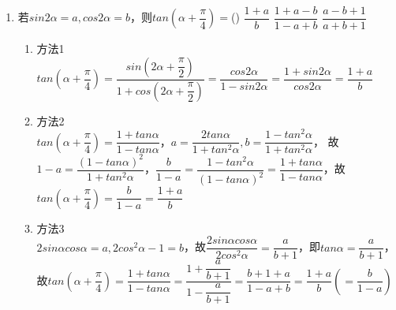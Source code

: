 \begin{enumerate}
\begin{enumerate}
        \item 若$sin2\alpha = a, cos2\alpha = b$，则$tan(\alpha + \dfrac{\pi}{4}) = $\dotfill()
        {$\dfrac{1+a}{b}$}
        {$\dfrac{1+a-b}{1-a+b}$}
        {$\dfrac{a-b+1}{a+b+1}$}
        \begin{jieda}
            \begin{enumerate}
                \item 方法1 \\
                $tan(\alpha + \dfrac{\pi}{4}) = \dfrac{sin(2\alpha+\dfrac{\pi}{2})}{1 + cos(2\alpha+\dfrac{\pi}{2})} = \dfrac{cos2\alpha}{1 - sin2\alpha} = \dfrac{1+sin2\alpha}{cos2\alpha} = \dfrac{1+a}{b}$
                \item 方法2 \\
                $tan(\alpha + \dfrac{\pi}{4}) = \dfrac{1+tan\alpha}{1-tan\alpha}$，$a = \dfrac{2tan\alpha}{1+tan^2\alpha}, b = \dfrac{1-tan^2\alpha}{1+tan^2\alpha}$，
                故$1-a = \dfrac{(1-tan\alpha)^2}{1+tan^2\alpha}$，$\dfrac{b}{1-a} = \dfrac{1-tan^2\alpha}{(1-tan\alpha)^2} = \dfrac{1+tan\alpha}{1-tan\alpha}$，故$tan(\alpha + \dfrac{\pi}{4}) = \dfrac{b}{1-a} = \dfrac{1+a}{b}$
                \item 方法3 \\
                $2sin\alpha cos\alpha = a, 2cos^2\alpha - 1 = b$，故$\dfrac{2sin\alpha cos\alpha}{2cos^2\alpha} = \dfrac{a}{b+1}$，即$tan\alpha = \dfrac{a}{b+1}$，\\
                故$tan(\alpha+\dfrac{\pi}{4}) = \dfrac{1+tan\alpha}{1-tan\alpha} = \dfrac{1 + \dfrac{a}{b+1}}{1 - \dfrac{a}{b+1}} = \dfrac{b+1+a}{1-a + b} = \dfrac{1+a}{b}( = \dfrac{b}{1-a})$
            \end{enumerate}
        \end{jieda}
        

\end{enumerate}
\end{enumerate}
